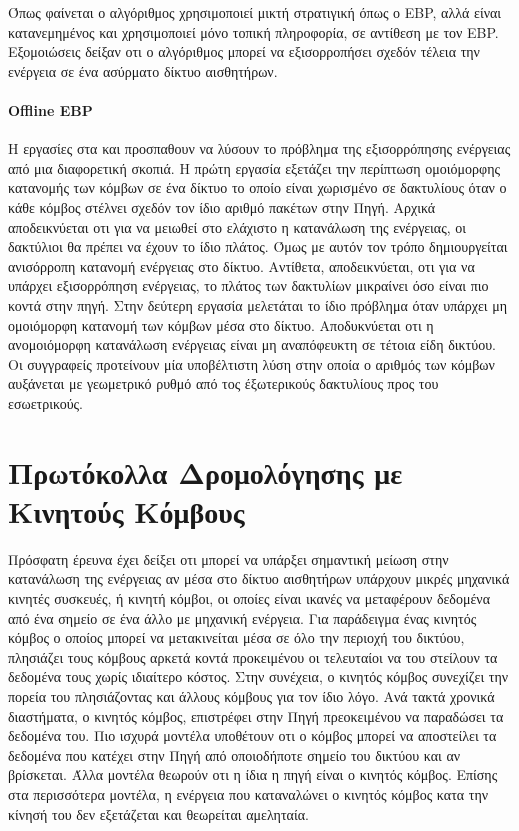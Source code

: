 Όπως φαίνεται ο αλγόριθμος χρησιμοποιεί μικτή στρατιγική όπως ο EBP, αλλά είναι κατανεμημένος και χρησιμοποιεί μόνο τοπική πληροφορία, σε αντίθεση με τον EBP.
Εξομοιώσεις δείξαν οτι ο αλγόριθμος μπορεί να εξισορροπήσει σχεδόν τέλεια την ενέργεια σε ένα ασύρματο δίκτυο αισθητήρων.

\paragraph{Offline EBP} H εργασίες στα \cite{oebp_protocol1} και \cite{oebp_protocol2} προσπαθουν να λύσουν το πρόβλημα της εξισορρόπησης ενέργειας από μια
διαφορετική σκοπιά. Η πρώτη εργασία εξετάζει την περίπτωση ομοιόμορφης κατανομής των κόμβων σε ένα δίκτυο το οποίο είναι χωρισμένο σε δακτυλίους όταν ο κάθε κόμβος
στέλνει σχεδόν τον ίδιο αριθμό πακέτων στην Πηγή. Αρχικά αποδεικνύεται οτι για να μειωθεί στο ελάχιστο η κατανάλωση της ενέργειας, οι δακτύλιοι θα πρέπει να έχουν το
ίδιο πλάτος. Όμως με αυτόν τον τρόπο δημιουργείται ανισόρροπη κατανομή ενέργειας στο δίκτυο. Αντίθετα, αποδεικνύεται, οτι για να υπάρχει εξισορρόπηση ενέργειας, το
πλάτος των δακτυλίων μικραίνει όσο είναι πιο κοντά στην πηγή. Στην δεύτερη εργασία μελετάται το ίδιο πρόβλημα όταν υπάρχει μη ομοιόμορφη κατανομή των κόμβων μέσα στο
δίκτυο. Αποδυκνύεται οτι η ανομοιόμορφη κατανάλωση ενέργειας είναι μη αναπόφευκτη σε τέτοια είδη δικτύου. Οι συγγραφείς προτείνουν μία υποβέλτιστη λύση στην οποία ο
αριθμός των κόμβων αυξάνεται με γεωμετρικό ρυθμό από τος έξωτερικούς δακτυλίους προς του εσωετρικούς.


\section{Πρωτόκολλα Δρομολόγησης με Κινητούς Κόμβους}
Πρόσφατη έρευνα έχει δείξει οτι μπορεί να υπάρξει σημαντική μείωση στην κατανάλωση της ενέργειας αν μέσα στο δίκτυο αισθητήρων υπάρχουν μικρές μηχανικά κινητές
συσκευές, ή κινητή κόμβοι, οι οποίες είναι ικανές να μεταφέρουν δεδομένα από ένα σημείο σε ένα άλλο με μηχανική ενέργεια. Για παράδειγμα ένας κινητός κόμβος ο οποίος
μπορεί να μετακινείται μέσα σε όλο την περιοχή του δικτύου, πλησιάζει τους κόμβους αρκετά κοντά προκειμένου οι τελευταίοι να του στείλουν τα δεδομένα τους χωρίς
ιδιαίτερο κόστος. Στην συνέχεια, ο κινητός κόμβος συνεχίζει την πορεία του πλησιάζοντας και άλλους κόμβους για τον ίδιο λόγο. Ανά τακτά χρονικά διαστήματα, ο
κινητός κόμβος, επιστρέφει στην Πηγή πρεοκειμένου να παραδώσει τα δεδομένα του. Πιο ισχυρά μοντέλα υποθέτουν οτι ο κόμβος μπορεί να αποστείλει τα δεδομένα που κατέχει
στην Πηγή από οποιοδήποτε σημείο του δικτύου και αν βρίσκεται. Άλλα μοντέλα θεωρούν οτι η ίδια η πηγή είναι ο κινητός κόμβος. Επίσης στα περισσότερα μοντέλα, η
ενέργεια που καταναλώνει ο κινητός κόμβος κατα την κίνησή του δεν εξετάζεται και θεωρείται αμεληταία.

